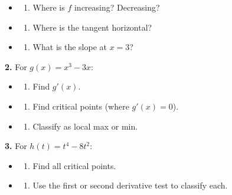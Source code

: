 \documentclass[
  11pt,
]{article}
\providecommand{\tightlist}{%
  \setlength{\itemsep}{0pt}\setlength{\parskip}{0pt}}
\begin{document}
\begin{itemize}
\item
  \begin{enumerate}
  \def\labelenumi{(\alph{enumi})}
  \tightlist
  \item
    Where is \(f\) increasing? Decreasing?
  \end{enumerate}
\item
  \begin{enumerate}
  \def\labelenumi{(\alph{enumi})}
  \setcounter{enumi}{1}
  \tightlist
  \item
    Where is the tangent horizontal?
  \end{enumerate}
\item
  \begin{enumerate}
  \def\labelenumi{(\alph{enumi})}
  \setcounter{enumi}{2}
  \tightlist
  \item
    What is the slope at \(x = 3\)?
  \end{enumerate}
\end{itemize}

\textbf{2.} For \(g(x) = x^3 - 3x\):

\begin{itemize}
\item
  \begin{enumerate}
  \def\labelenumi{(\alph{enumi})}
  \tightlist
  \item
    Find \(g'(x)\).
  \end{enumerate}
\item
  \begin{enumerate}
  \def\labelenumi{(\alph{enumi})}
  \setcounter{enumi}{1}
  \tightlist
  \item
    Find critical points (where \(g'(x) = 0\)).
  \end{enumerate}
\item
  \begin{enumerate}
  \def\labelenumi{(\alph{enumi})}
  \setcounter{enumi}{2}
  \tightlist
  \item
    Classify as local max or min.
  \end{enumerate}
\end{itemize}

\textbf{3.} For \(h(t) = t^4 - 8t^2\):

\begin{itemize}
\item
  \begin{enumerate}
  \def\labelenumi{(\alph{enumi})}
  \tightlist
  \item
    Find all critical points.
  \end{enumerate}
\item
  \begin{enumerate}
  \def\labelenumi{(\alph{enumi})}
  \setcounter{enumi}{1}
  \tightlist
  \item
    Use the first or second derivative test to classify each.
  \end{enumerate}
\end{itemize}
\end{document}
